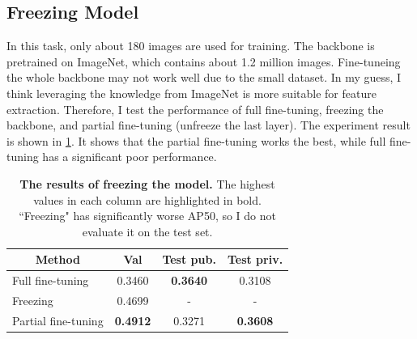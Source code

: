 \documentclass[10pt,twocolumn,letterpaper]{article}
\begin{document}
\subsection*{Freezing Model}

In this task, only about 180 images are used for training. The backbone
is pretrained on ImageNet, which contains about 1.2 million images.
Fine-tuneing the whole backbone may not work well due to the small dataset.
In my guess, I think leveraging the knowledge from ImageNet is more suitable
for feature extraction. Therefore, I test the performance of full fine-tuning,
freezing the backbone, and partial fine-tuning (unfreeze the last layer).
The experiment result is shown in \cref{tab:exp-freeze}. It shows that the
partial fine-tuning works the best, while full fine-tuning has a significant
poor performance.

\begin{table}[h]
  \centering
  \begin{tabular}{lccc}
    \toprule
    \multicolumn{1}{c}{\textbf{Method}} & \textbf{Val}    & \textbf{Test pub.} & \textbf{Test priv.} \\
    \midrule
    Full fine-tuning                     & 0.3460          & \textbf{0.3640}    & 0.3108              \\
    Freezing                            & 0.4699          & -                  & -                   \\
    Partial fine-tuning                  & \textbf{0.4912} & 0.3271             & \textbf{0.3608}     \\
    \bottomrule
  \end{tabular}
  \caption{\textbf{The results of freezing the model.} The highest values
  in each column are highlighted in bold. ``Freezing" has
  significantly worse AP50, so I do not evaluate it on the test set. 
  }
  
  \label{tab:exp-freeze}
\end{table}


{\small


}
\end{document}
